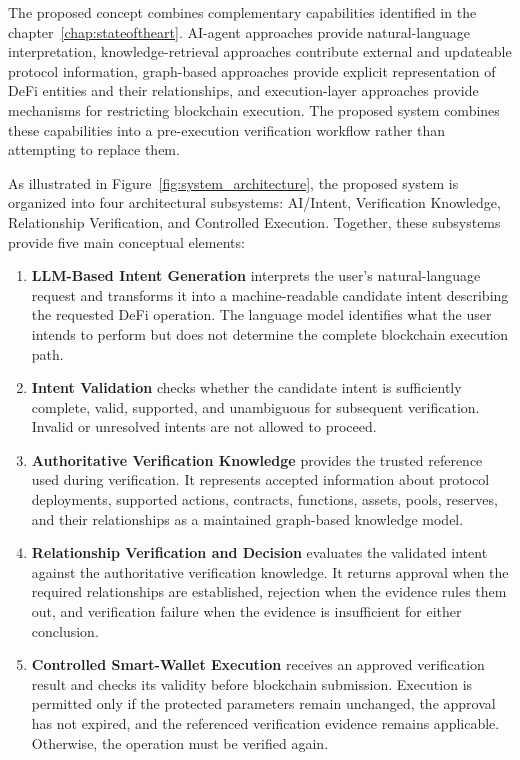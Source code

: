 The proposed concept combines complementary capabilities identified in the
chapter~\ref{chap:stateoftheart}. AI-agent approaches provide natural-language interpretation,
knowledge-retrieval approaches contribute external and updateable protocol
information, graph-based approaches provide explicit representation of DeFi
entities and their relationships, and execution-layer approaches provide
mechanisms for restricting blockchain execution. The proposed system combines
these capabilities into a pre-execution verification workflow rather than
attempting to replace them.

As illustrated in Figure~\ref{fig:system_architecture}, the proposed system
is organized into four architectural subsystems: AI/Intent, Verification
Knowledge, Relationship Verification, and Controlled Execution. Together,
these subsystems provide five main conceptual elements:

\begin{enumerate}

    \item \textbf{LLM-Based Intent Generation} interprets the user's
    natural-language request and transforms it into a machine-readable
    candidate intent describing the requested DeFi operation. The language
    model identifies what the user intends to perform but does not determine
    the complete blockchain execution path.

    \item \textbf{Intent Validation} checks whether the candidate intent is
    sufficiently complete, valid, supported, and unambiguous for subsequent
    verification. Invalid or unresolved intents are not allowed to proceed.

    \item \textbf{Authoritative Verification Knowledge} provides the trusted
    reference used during verification. It represents accepted information
    about protocol deployments, supported actions, contracts, functions,
    assets, pools, reserves, and their relationships as a maintained
    graph-based knowledge model.

    \item \textbf{Relationship Verification and Decision} evaluates the
    validated intent against the authoritative verification knowledge. It returns approval when the required relationships are established, rejection when the evidence rules them out, and verification failure when the evidence is insufficient for either conclusion.

\item \textbf{Controlled Smart-Wallet Execution} receives an approved
verification result and checks its validity before blockchain submission.
Execution is permitted only if the protected parameters remain unchanged,
the approval has not expired, and the referenced verification evidence
remains applicable. Otherwise, the operation must be verified again.

\end{enumerate}

